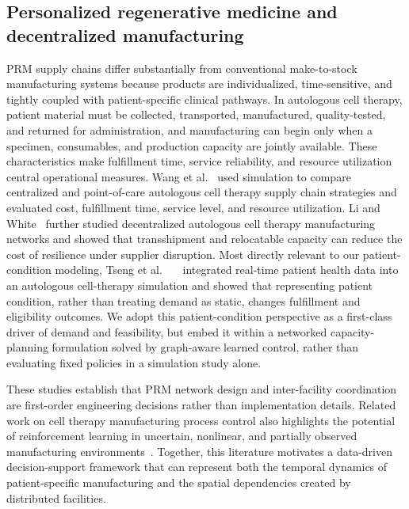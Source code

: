 \documentclass[preprint,review,12pt,nonatbib]{elsarticle}
\providecommand{\DIFadd}[1]{{\protect\color{blue}#1}} %
\providecommand{\DIFaddbegin}{} %
\providecommand{\DIFaddend}{} %
\providecommand{\DIFaddincludegraphics}[2][]{{\color{blue}\fbox{\DIFOincludegraphics[#1]{#2}}}} %
\DeclareRobustCommand{\DIFaddbegin}{\DIFOaddbegin \let\includegraphics\DIFaddincludegraphics} %
\DeclareRobustCommand{\DIFaddend}{\DIFOaddend \let\includegraphics\DIFOincludegraphics} %
\begin{document}
\DIFaddend \subsection{Personalized regenerative medicine and decentralized manufacturing}
PRM supply chains differ substantially from conventional make-to-stock manufacturing systems because products are individualized, time-sensitive, and tightly coupled with patient-specific clinical pathways. In autologous cell therapy, patient material must be collected, transported, manufactured, quality-tested, and returned for administration, and manufacturing can begin only when a specimen, consumables, and production capacity are jointly available. These characteristics make fulfillment time, service reliability, and resource utilization central operational measures. Wang et al.~\cite{Wang2023SimulationBased} used simulation to compare centralized and point-of-care autologous cell therapy supply chain strategies and evaluated cost, fulfillment time, service level, and resource utilization. Li and White~\cite{Li2023} further studied decentralized autologous cell therapy manufacturing networks and showed that transshipment and relocatable capacity can reduce the cost of resilience under supplier disruption. \DIFaddbegin \DIFadd{Most directly relevant to our patient-condition modeling, Tseng et al.~\mbox{%
\cite{Tseng2024PatientHealth} }\hskip0pt%
integrated real-time patient health data into an autologous cell-therapy simulation and showed that representing patient condition, rather than treating demand as static, changes fulfillment and eligibility outcomes. We adopt this patient-condition perspective as a first-class driver of demand and feasibility, but embed it within a networked capacity-planning formulation solved by graph-aware learned control, rather than evaluating fixed policies in a simulation study alone.
}\DIFaddend 

These studies establish that PRM network design and inter-facility coordination are first-order engineering decisions rather than implementation details. Related work on cell therapy manufacturing process control also highlights the potential of reinforcement learning in uncertain, nonlinear, and partially observed manufacturing environments~\cite{Zheng2022HybridMBRL}. Together, this literature motivates a data-driven decision-support framework that can represent both the temporal dynamics of patient-specific manufacturing and the spatial dependencies created by distributed facilities.
\end{document}
